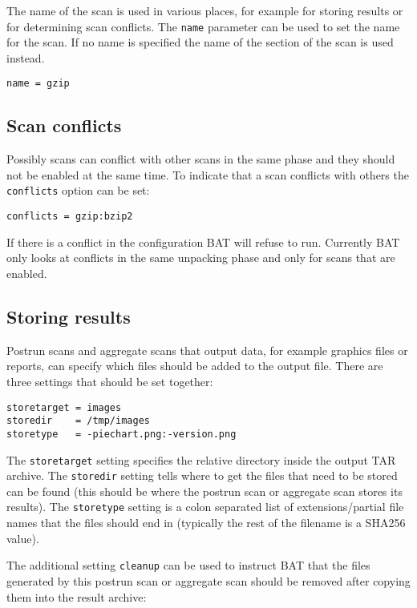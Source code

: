 \documentclass[10pt,a4paper]{article}
\begin{document}
The name of the scan is used in various places, for example for storing results
or for determining scan conflicts. The \texttt{name} parameter can be used to
set the name for the scan. If no name is specified the name of the section of
the scan is used instead.

\begin{verbatim}
name = gzip
\end{verbatim}

\subsection{Scan conflicts}

Possibly scans can conflict with other scans in the same phase and they should
not be enabled at the same time. To indicate that a scan conflicts with others
the \texttt{conflicts} option can be set:

\begin{verbatim}
conflicts = gzip:bzip2
\end{verbatim}

If there is a conflict in the configuration BAT will refuse to run. Currently
BAT only looks at conflicts in the same unpacking phase and only for scans that
are enabled.

\subsection{Storing results}

Postrun scans and aggregate scans that output data, for example graphics files
or reports, can specify which files should be added to the output file. There
are three settings that should be set together:

\begin{verbatim}
storetarget = images
storedir    = /tmp/images
storetype   = -piechart.png:-version.png
\end{verbatim}

The \texttt{storetarget} setting specifies the relative directory inside the
output TAR archive. The \texttt{storedir} setting tells where to get the files
that need to be stored can be found (this should be where the postrun scan
or aggregate scan stores its results). The \texttt{storetype} setting is a colon
separated list of extensions/partial file names that the files should end in
(typically the rest of the filename is a SHA256 value).

The additional setting \texttt{cleanup} can be used to instruct BAT that the
files generated by this postrun scan or aggregate scan should be removed after
copying them into the result archive:
\end{document}
